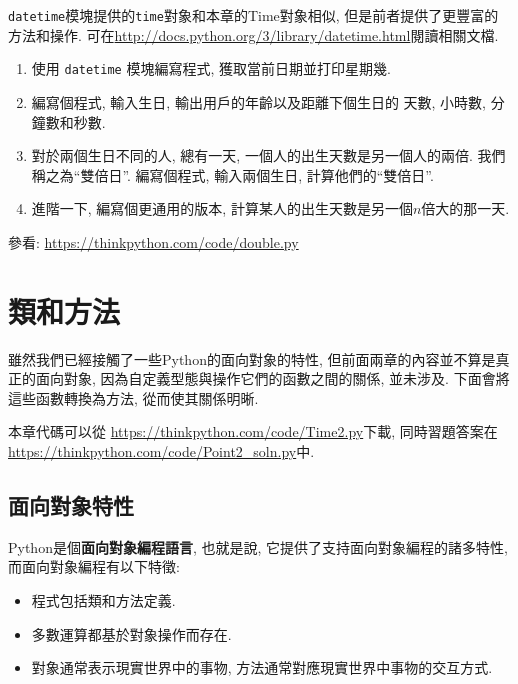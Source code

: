 \documentclass[10pt]{book}
\begin{document}
\begin{exercise}

{\tt datetime}模塊提供的{\tt time}對象和本章的Time對象相似, 
但是前者提供了更豐富的方法和操作. 
可在\url{http://docs.python.org/3/library/datetime.html}閱讀相關文檔.

\begin{enumerate}

\item 使用 {\tt datetime} 模塊編寫程式, 獲取當前日期並打印星期幾. 

\item 編寫個程式, 輸入生日, 輸出用戶的年齡以及距離下個生日的
天數, 小時數, 分鐘數和秒數. 

\item 對於兩個生日不同的人, 
總有一天, 一個人的出生天數是另一個人的兩倍. 
我們稱之為``雙倍日''.
編寫個程式, 輸入兩個生日, 計算他們的``雙倍日''.

\item 進階一下, 編寫個更通用的版本, 計算某人的出生天數是另一個$n$倍大的那一天. 

\end{enumerate}

參看: \url{https://thinkpython.com/code/double.py}

\end{exercise}


\chapter{類和方法}

雖然我們已經接觸了一些Python的面向對象的特性, 
但前面兩章的內容並不算是真正的面向對象, 
因為自定義型態與操作它們的函數之間的關係, 並未涉及. 
下面會將這些函數轉換為方法, 從而使其關係明晰. 

本章代碼可以從
\url{https://thinkpython.com/code/Time2.py}下載, 
同時習題答案在\url{https://thinkpython.com/code/Point2_soln.py}中.


\section{面向對象特性}

Python是個{\bf 面向對象編程語言}, 
也就是說, 它提供了支持面向對象編程的諸多特性, 而面向對象編程有以下特徵:

\begin{itemize}

\item 程式包括類和方法定義.

\item 多數運算都基於對象操作而存在. 

\item 對象通常表示現實世界中的事物, 方法通常對應現實世界中事物的交互方式. 

\end{itemize}
\end{document}
